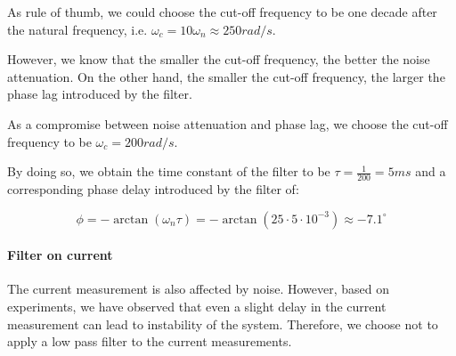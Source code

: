 As rule of thumb, we could choose the cut-off frequency to be one decade after the natural frequency, i.e. $\omega_c = 10 \omega_n \approx 250 rad/s$.

However, we know that the smaller the cut-off frequency, the better the noise attenuation.
On the other hand, the smaller the cut-off frequency, the larger the phase lag introduced by the filter.

As a compromise between noise attenuation and phase lag, we choose the cut-off frequency to be $\omega_c = 200 rad/s$.

By doing so, we obtain the time constant of the filter to be $\tau = \frac{1}{200} = 5 ms$ and a corresponding phase delay introduced by the filter of:

\begin{equation}
    \phi = -\arctan{(\omega_n \tau)} = -\arctan{(25 \cdot 5 \cdot 10^{-3})} \approx -7.1^{\circ}
\end{equation}


\paragraph{Filter on current}

The current measurement is also affected by noise.
However, based on experiments, we have observed that even a slight delay in the current measurement can lead to instability of the system.
Therefore, we choose not to apply a low pass filter to the current measurements.

